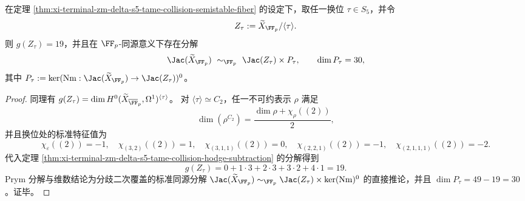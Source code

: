 \begin{corollary}\label{cor:xi-terminal-zm-delta-s5-tame-collision-transposition-quotient-prym}
在定理 \ref{thm:xi-terminal-zm-delta-s5-tame-collision-semistable-fiber} 的设定下，取任一换位 \(\tau\in S_5\)，并令
\[
Z_\tau:=\widetilde X_{\FF_p}/\langle\tau\rangle.
\]
则 \(g(Z_\tau)=19\)，并且在 \(\FF_p\)-同源意义下存在分解
\[
\Jac(\widetilde X_{\FF_p})\ \sim_{\FF_p}\ \Jac(Z_\tau)\times P_\tau,
\qquad
\dim P_\tau = 30,
\]
其中 \(P_\tau:=\ker(\operatorname{Nm}:\Jac(\widetilde X_{\FF_p})\to\Jac(Z_\tau))^0\)。
\end{corollary}
\begin{proof}
同理有
\(
g(Z_\tau)=\dim H^0(\widetilde X_{\overline{\FF}_p},\Omega^1)^{\langle\tau\rangle}
\)。
对 \(\langle\tau\rangle\simeq C_2\)，任一不可约表示 \(\rho\) 满足
\[
\dim(\rho^{C_2})=\frac{\dim\rho+\chi_\rho((2))}{2},
\]
并且换位处的标准特征值为
\[
\chi_\varepsilon((2))=-1,\quad
\chi_{(3,2)}((2))=1,\quad
\chi_{(3,1,1)}((2))=0,\quad
\chi_{(2,2,1)}((2))=-1,\quad
\chi_{(2,1,1,1)}((2))=-2.
\]
代入定理 \ref{thm:xi-terminal-zm-delta-s5-tame-collision-hodge-subtraction} 的分解得到
\[
g(Z_\tau)=0+1\cdot 3+2\cdot 3+3\cdot 2+4\cdot 1=19.
\]
Prym 分解与维数结论为分歧二次覆盖的标准同源分解
\(
\Jac(\widetilde X_{\FF_p})\sim_{\FF_p}\Jac(Z_\tau)\times \ker(\operatorname{Nm})^0
\)
的直接推论，并且 \(\dim P_\tau=49-19=30\)。证毕。
\end{proof}

